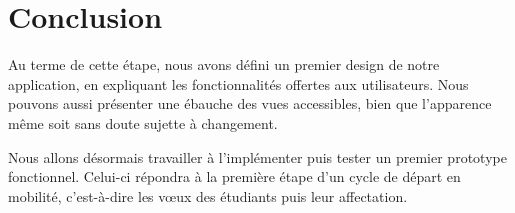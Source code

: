 \chapter*{Conclusion}

Au terme de cette étape, nous avons défini un premier design de notre application, en expliquant les fonctionnalités offertes aux utilisateurs. Nous pouvons aussi présenter une ébauche des vues accessibles, bien que l'apparence même soit sans doute sujette à changement.

Nous allons désormais travailler à l'implémenter puis tester un premier prototype fonctionnel. Celui-ci répondra à la première étape d'un cycle de départ en mobilité, c'est-à-dire les vœux des étudiants puis leur affectation.